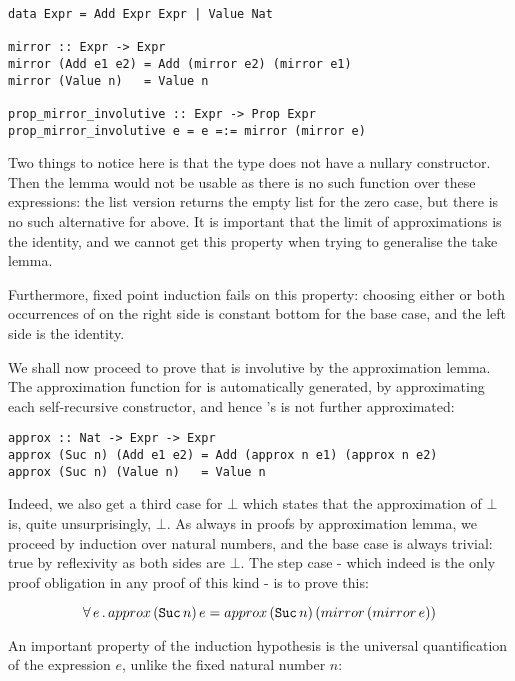 \begin{verbatim}
data Expr = Add Expr Expr | Value Nat

mirror :: Expr -> Expr
mirror (Add e1 e2) = Add (mirror e2) (mirror e1)
mirror (Value n)   = Value n

prop_mirror_involutive :: Expr -> Prop Expr
prop_mirror_involutive e = e =:= mirror (mirror e)
\end{verbatim}

Two things to notice here is that the type  does not have a
nullary constructor. Then the  lemma would not be usable as
there is no such function over these expressions: the list version
returns the empty list \hs{[]} for the zero case, but there is no such
alternative for  above. It is important that the limit of
approximations is the identity, and we cannot get this property when
trying to generalise the take lemma.

Furthermore, fixed point induction fails on this property: choosing
either or both occurrences of  on the right side is
constant bottom for the base case, and the left side is the identity.


We shall now proceed to prove that  is involutive by the
approximation lemma. The approximation function for  is
automatically generated, by approximating each self-recursive
constructor, and hence 's  is not further approximated:

\begin{verbatim}
approx :: Nat -> Expr -> Expr
approx (Suc n) (Add e1 e2) = Add (approx n e1) (approx n e2)
approx (Suc n) (Value n)   = Value n
\end{verbatim}

Indeed, we also get a third case for $\bot$ which states that the
approximation of $\bot$ is, quite unsurprisingly, $\bot$. As always in
proofs by approximation lemma, we proceed by induction over natural
numbers, and the base case is always trivial: true by reflexivity as
both sides are $\bot$. The step case - which indeed is the only proof
obligation in any proof of this kind - is to prove this:

\begin{equation*}
\fa{e}  approx \, (\hs{Suc} \, n) \, e = approx \, (\hs{Suc} \, n) \, (mirror \, (mirror \, e))
\end{equation*}

An important property of the induction hypothesis is the universal
quantification of the expression $e$, unlike the fixed natural number
$n$:

